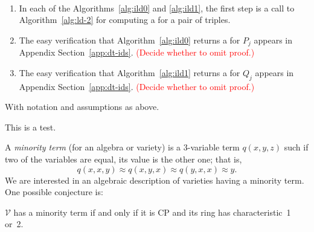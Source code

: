 \begin{remarks}\
\begin{enumerate}[1.]
\item In each of the Algorithms~\ref{alg:ild0} and \ref{alg:ild1},
the first step is a call to Algorithm~\ref{alg:ld-2}
for computing a \ldto for a pair of triples.
\item The easy verification that Algorithm~\ref{alg:ild0} returns
a \ldto for $P_j$ appears in Appendix Section~\ref{app:dt-ids}.
\textcolor{red}{(Decide whether to omit proof.)}
\item The easy verification that Algorithm~\ref{alg:ild1} returns
a \ldto for $Q_j$ appears in Appendix Section~\ref{app:dt-ids}.
\textcolor{red}{(Decide whether to omit proof.)}
\end{enumerate}
\end{remarks}


























With notation and assumptions as above.

\begin{theorem}
This is a test.
\end{theorem}







%




A \emph{minority term} (for an algebra or variety) is a
3-variable term $q(x,y,z)$ such if two of the variables
are equal, its value is the other one; that is,
\[
q(x,x,y) \approx q(x,y,x) \approx q(y,x,x) \approx y.
\]
We are interested in an algebraic description of varieties having
a minority term. One possible conjecture is:
\begin{conjecture}
$\mathcal V$ has a minority term if and only if it is CP and its
ring has characteristic~1 or~2.
\end{conjecture}



